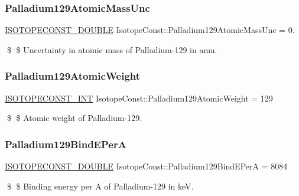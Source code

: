 \subsubsection{\texorpdfstring{Palladium129\+Atomic\+Mass\+Unc}{Palladium129AtomicMassUnc}}
{\footnotesize\ttfamily \mbox{\hyperlink{group___isotope_const-_macros_ga8f45a7272ce02c0b4c65c44636ed719a}{I\+S\+O\+T\+O\+P\+E\+C\+O\+N\+S\+T\+\_\+\+D\+O\+U\+B\+LE}} Isotope\+Const\+::\+Palladium129\+Atomic\+Mass\+Unc = 0.}

\$ \$ Uncertainty in atomic mass of Palladium-\/129 in amu. \mbox{\label{group___isotope_const-_palladium-_pd129_ga43efbb494d5f154a6a8f9bc98a527fc3}} 
\subsubsection{\texorpdfstring{Palladium129\+Atomic\+Weight}{Palladium129AtomicWeight}}
{\footnotesize\ttfamily \mbox{\hyperlink{group___isotope_const-_macros_ga5f18360b3e99483a35c32d789e62621c}{I\+S\+O\+T\+O\+P\+E\+C\+O\+N\+S\+T\+\_\+\+I\+NT}} Isotope\+Const\+::\+Palladium129\+Atomic\+Weight = 129}

\$ \$ Atomic weight of Palladium-\/129. \mbox{\label{group___isotope_const-_palladium-_pd129_ga457166c71a8867698d17e86037c0d488}} 
\subsubsection{\texorpdfstring{Palladium129\+Bind\+E\+PerA}{Palladium129BindEPerA}}
{\footnotesize\ttfamily \mbox{\hyperlink{group___isotope_const-_macros_ga8f45a7272ce02c0b4c65c44636ed719a}{I\+S\+O\+T\+O\+P\+E\+C\+O\+N\+S\+T\+\_\+\+D\+O\+U\+B\+LE}} Isotope\+Const\+::\+Palladium129\+Bind\+E\+PerA = 8084}

\$ \$ Binding energy per A of Palladium-\/129 in keV. \mbox{\label{group___isotope_const-_palladium-_pd129_ga2af70c17a3dd3368fed2249582d52c4e}} 
